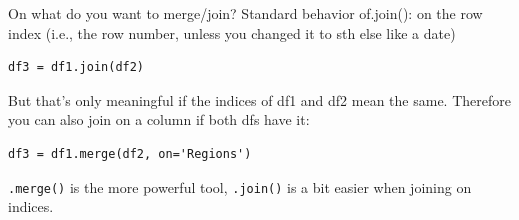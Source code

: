 \documentclass[handout]{beamer}
\begin{document}
{
	\begin{frame}[plain]
\end{frame}
	\begin{frame}[plain]
\end{frame}
}

\begin{frame}[fragile]{On what do you want to merge/join?}
Standard behavior of.join(): on the row index  (i.e., the row number, unless
you changed it to sth else like a date)
\begin{lstlisting}
df3 = df1.join(df2)
\end{lstlisting}
\pause
But that’s only meaningful if the indices of df1 and df2 mean the same. Therefore you can also join on a column if both dfs have it:
\begin{lstlisting}
df3 = df1.merge(df2, on='Regions')
\end{lstlisting}
\pause
\texttt{.merge()} is the more powerful tool, \texttt{.join()} is a bit easier when joining on indices.
\end{frame}
\end{document}
